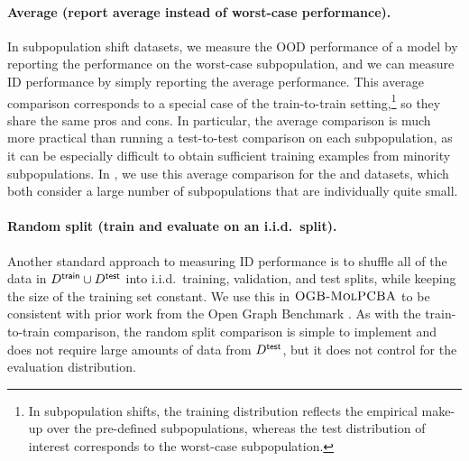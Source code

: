 \paragraph{Average (report average instead of worst-case performance).}
In subpopulation shift datasets, we measure the OOD performance of a model by reporting the performance on the worst-case subpopulation, and we can measure ID performance by simply reporting the average performance.
This average comparison corresponds to a special case of the train-to-train setting,\footnote{In subpopulation shifts, the training distribution reflects the empirical make-up over the pre-defined subpopulations, whereas the test distribution of interest corresponds to the worst-case subpopulation.}
so they share the same pros and cons.
In particular, the average comparison is much more practical than running a test-to-test comparison on each subpopulation, as it can be especially difficult to obtain sufficient training examples from minority subpopulations.
In , we use this average comparison for the \CivilComments and \Amazon datasets, which both consider a large number of subpopulations that are individually quite small.


\paragraph{Random split (train and evaluate on an i.i.d.~split).}
Another standard approach to measuring ID performance is to shuffle all of the data in $D^\mathsf{train} \cup D^\mathsf{test}$ into i.i.d.~training, validation, and test splits, while keeping the size of the training set constant.
We use this in $\textsc{OGB-MolPCBA{}}$ to be consistent with prior work from the Open Graph Benchmark \citep{hu2020open}.
As with the train-to-train comparison, the random split comparison is simple to implement and does not require large amounts of data from $D^\mathsf{test}$, but it does not control for the evaluation distribution.


